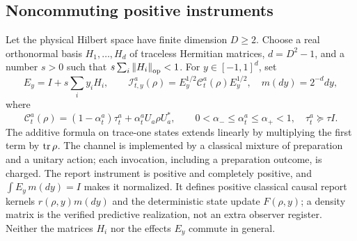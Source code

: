 \subsection{Noncommuting positive instruments}
Let the physical Hilbert space have finite dimension $D\ge2$. Choose a real orthonormal basis $H_1,\ldots,H_d$ of traceless Hermitian matrices, $d=D^2-1$, and a number $s>0$ such that $s\sum_i\left\lVert H_i\right\rVert_{\rm op}<1$. For $y\in[-1,1]^d$, set
\begin{equation}\label{eq:quantumraw}
 E_y=I+s\sum_i y_iH_i,\qquad
 \mathcal I_{t,y}^a(\rho)=E_y^{1/2}\mathcal C_t^a(\rho)E_y^{1/2},
 \quad m(dy)=2^{-d}dy,
\end{equation}
where
\[
 \mathcal C_t^a(\rho)=(1-\alpha_t^a)\tau_t^a+
 \alpha_t^a U_a\rho U_a^*,\qquad
 0<\alpha_-\le\alpha_t^a\le\alpha_+<1,
 \quad \tau_t^a\succeq\tau I.
\]
The additive formula on trace-one states extends linearly by multiplying the first term by $\operatorname{tr}\rho$. The channel is implemented by a classical mixture of preparation and a unitary action; each invocation, including a preparation outcome, is charged. The report instrument is positive and completely positive, and $\int E_y\,m(dy)=I$ makes it normalized. It defines positive classical causal report kernels $r(\rho,y)m(dy)$ and the deterministic state update $F(\rho,y)$; a density matrix is the verified predictive realization, not an extra observer register. Neither the matrices $H_i$ nor the effects $E_y$ commute in general.

